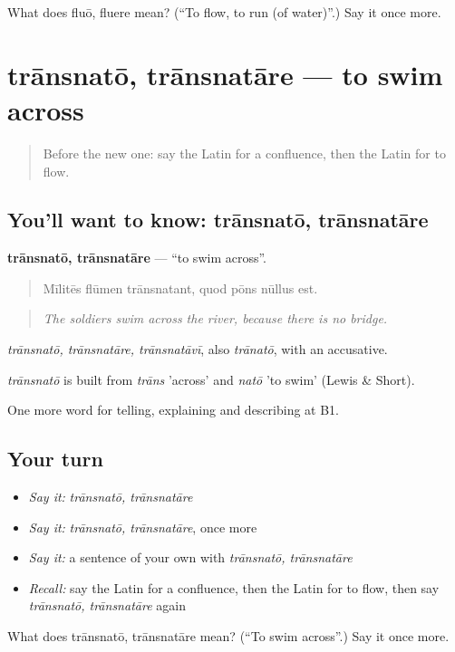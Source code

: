 \begin{tcolorbox}[breakable,colback=teal!4,colframe=teal!35!black,title={Before you move on}]
What does fluō, fluere mean? (\textquotedblleft{}To flow, to run (of water)\textquotedblright{}.) Say it once more.
\end{tcolorbox}
\section[trānsnatō, trānsnatāre]{trānsnatō, trānsnatāre — to swim across}

\label{lesson:LA-C482-transnato}



\begin{quote}
Before the new one: say the Latin for a confluence, then the Latin for to flow.
\end{quote}

\subsection*{You'll want to know: trānsnatō, trānsnatāre}
\textbf{trānsnatō, trānsnatāre} — \textquotedblleft{}to swim across\textquotedblright{}.

\begin{quote}
Mīlitēs flūmen trānsnatant, quod pōns nūllus est.
\end{quote}

\begin{quote}
\emph{The soldiers swim across the river, because there is no bridge.}
\end{quote}

\emph{trānsnatō, trānsnatāre, trānsnatāvī}, also \emph{trānatō}, with an accusative.

\begin{cousinweb}
\emph{trānsnatō} is built from \emph{trāns} 'across' and \emph{natō} 'to swim' (Lewis \& Short).
\end{cousinweb}

\begin{grammarlens}[title={What you've built}]
One more word for telling, explaining and describing at B1.
\end{grammarlens}

\subsection*{Your turn}
\begin{itemize}
\raggedright
  \item \emph{Say it:} \emph{trānsnatō, trānsnatāre}
  \item \emph{Say it:} \emph{trānsnatō, trānsnatāre}, once more
  \item \emph{Say it:} a sentence of your own with \emph{trānsnatō, trānsnatāre}
  \item \emph{Recall:} say the Latin for a confluence, then the Latin for to flow, then say \emph{trānsnatō, trānsnatāre} again
\end{itemize}

\begin{tcolorbox}[breakable,colback=teal!4,colframe=teal!35!black,title={Before you move on}]
What does trānsnatō, trānsnatāre mean? (\textquotedblleft{}To swim across\textquotedblright{}.) Say it once more.
\end{tcolorbox}
